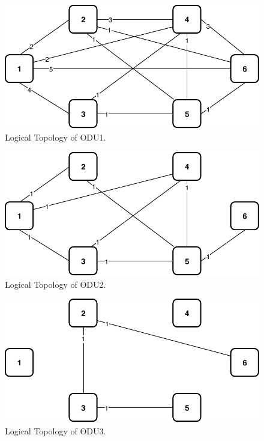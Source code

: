 \begin{figure}[h!]
\centering
\includegraphics[width=12cm]{sdf/ilp/opaque_survivability/figures/logical_topology_ODU1_low}
\caption{Logical Topology of ODU1.}
\label{logical_ODU1_low}
\end{figure}

\begin{figure}[h!]
\centering
\includegraphics[width=12cm]{sdf/ilp/opaque_survivability/figures/logical_topology_ODU2_low}
\caption{Logical Topology of ODU2.}
\label{logical_ODU2_low}
\end{figure}

\begin{figure}[h!]
\centering
\includegraphics[width=12cm]{sdf/ilp/opaque_survivability/figures/logical_topology_ODU3_low}
\caption{Logical Topology of ODU3.}
\label{logical_ODU3_low}
\end{figure}

